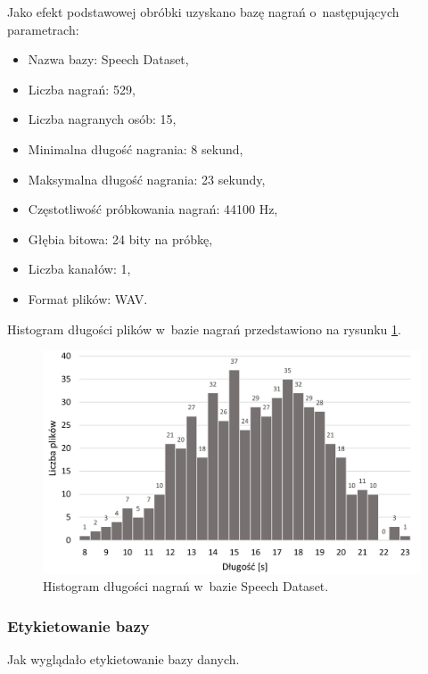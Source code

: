 Jako efekt podstawowej obróbki uzyskano bazę nagrań o~następujących parametrach:
\begin{itemize}
  \setlength\itemsep{-0.25em}
  \item Nazwa bazy: Speech Dataset,
  \item Liczba nagrań: 529,
  \item Liczba nagranych osób: 15,
  \item Minimalna długość nagrania: 8 sekund,
  \item Maksymalna długość nagrania: 23 sekundy,
  \item Częstotliwość próbkowania nagrań: 44100 Hz,
  \item Głębia bitowa: 24 bity na próbkę,
  \item Liczba kanałów: 1,
  \item Format plików: WAV.
\end{itemize}

Histogram długości plików w~bazie nagrań przedstawiono na rysunku \ref{rysunek:histogram_gsd}.

\begin{figure}[H]
    \centering
    \includegraphics{img/histogram_gsd.jpg}
    \caption{Histogram długości nagrań w~bazie Speech Dataset.}
    \label{rysunek:histogram_gsd}
\end{figure}

\subsubsection*{Etykietowanie bazy}

Jak wyglądało etykietowanie bazy danych.